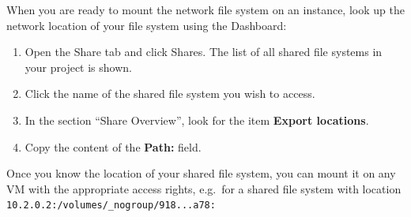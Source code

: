 When you are ready to mount the network file system on an instance,
look up the network location of your file system using the Dashboard:
\begin{enumerate}
\item Open the Share tab and click Shares.  The list of all shared file systems in your project is shown.
\item Click the name of the shared file system you wish to access.
\item In the section ``Share Overview'', look for the item \textbf{Export locations}.
\item Copy the content of the \textbf{Path:} field.
\end{enumerate}

Once you know the location of your shared file system, you can mount
it on any VM with the appropriate access rights, e.g.\ for a shared
file system with location
\lstinline{10.2.0.2:/volumes/_nogroup/918...a78:}

\begin{prompt}
\end{prompt}
